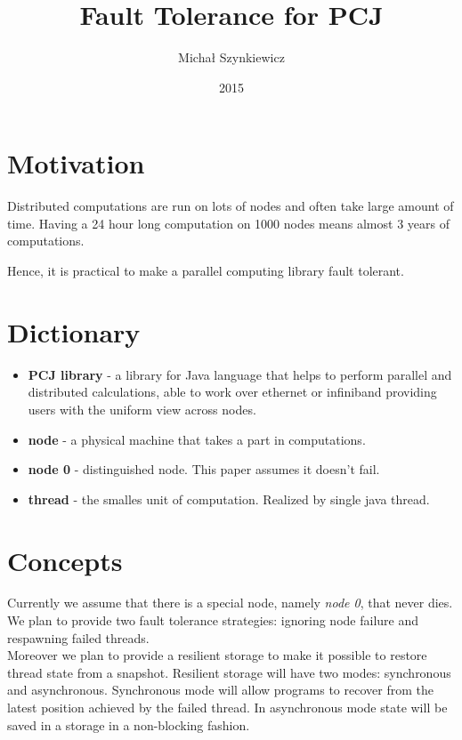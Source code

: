 \documentclass{llncs}
\begin{document}
\title{Fault Tolerance for PCJ}

\author{Michał Szynkiewicz}

\date{2015}
\maketitle

\section{Motivation}

Distributed computations are run on lots of nodes and often take large amount of time.
Having a 24 hour long computation on 1000 nodes means almost 3 years of computations.

Hence, it is practical to make a parallel computing library fault tolerant.

\section{Dictionary}
\begin{itemize}
\item \textbf{PCJ library} - a library for Java language that helps to perform parallel and distributed calculations, able to work over ethernet or infiniband providing users with the uniform view across nodes.

\item \textbf{node} - a physical machine that takes a part in computations.

\item \textbf{node 0} - distinguished node. This paper assumes it doesn't fail.

\item \textbf{thread} - the smalles unit of computation. Realized by single java thread.
\end{itemize}

\section{Concepts}
Currently we assume that there is a special node, namely \textit{node 0}, that never dies.
We plan to provide two fault tolerance strategies: ignoring node failure and respawning failed threads.
  \\
Moreover we plan to provide a resilient storage to make it possible to restore thread state from a snapshot.
Resilient storage will have two modes: synchronous and asynchronous.
Synchronous mode will allow programs to recover from the latest position achieved by the failed thread.
In asynchronous mode state will be saved in a storage in a non-blocking fashion.
\\
                \\
\end{document}
